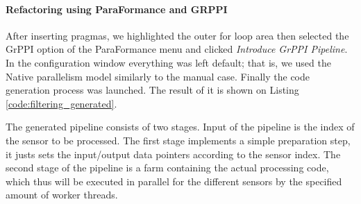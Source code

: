 \paragraph{Refactoring using ParaFormance and GRPPI}
After inserting pragmas, we highlighted the outer for loop area then selected the GrPPI option of the ParaFormance menu and clicked \emph{Introduce GrPPI Pipeline}. In the configuration window everything was left default; that is, we used the Native parallelism model similarly to the manual case. Finally the code generation process was launched. The result of it is shown on Listing \ref{code:filtering_generated}.

The generated pipeline consists of two stages. Input of the pipeline is the index of the sensor to be processed. The first stage implements a simple preparation step, it justs sets the input/output data pointers according to the sensor index. The second stage of the pipeline is a farm containing the actual processing code, which thus will be executed in parallel for the different sensors by the specified amount of worker threads.

